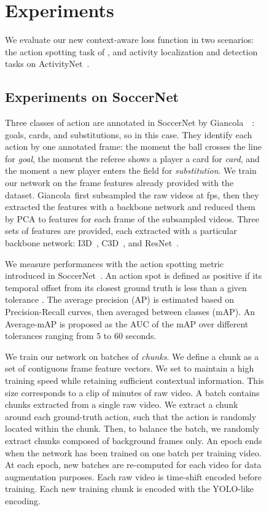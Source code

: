 \documentclass[10pt,twocolumn,letterpaper]{article}
\begin{document}
\begin{figure}[t]
{\begin{minipage}{\linewidth}
 \section{Experiments}
\label{sec:Exp}

We evaluate our new context-aware loss function in two scenarios: the action spotting task of \SoccerNet, and activity localization and detection tasks on ActivityNet~\cite{caba2015activitynet}.

\subsection{Experiments on SoccerNet}

 Three classes of action are annotated in SoccerNet by Giancola~\etal~\cite{Giancola_2018_CVPR_Workshops}: goals, cards, and substitutions, so  in this case. They identify each action by one annotated frame: the moment the ball crosses the line for \emph{goal}, the moment the referee shows a player a card for \emph{card}, and the moment a new player enters the field for \emph{substitution}. We train our network on the frame features already provided with the dataset. Giancola~\etal first subsampled the raw videos at  fps, then they extracted the features with a backbone network and reduced them by PCA to  features for each frame of the subsampled videos. Three sets of features are provided, each extracted with a particular backbone network: I3D~\cite{Carreira_2017_CVPR}, C3D~\cite{Tran2015ICCV}, and ResNet~\cite{He_2016_CVPR}.


We measure performances with the action spotting metric introduced in SoccerNet~\cite{Giancola_2018_CVPR_Workshops}. An action spot is defined as positive if its temporal offset from its closest ground truth is less than a given tolerance . The average precision (AP) is estimated based on Precision-Recall curves, then averaged between classes (mAP). An Average-mAP is proposed as the AUC of the mAP over different tolerances  ranging from 5 to 60 seconds.


 We train our network on batches of \emph{chunks}. We define a chunk as a set of  contiguous frame feature vectors. We set  to maintain a high training speed while retaining sufficient contextual information. This size corresponds to a clip of  minutes of raw video. A batch contains chunks extracted from a single raw video. We extract a chunk around each ground-truth action, such that the action is randomly located within the chunk. Then, to balance the batch, we randomly extract  chunks composed of background frames only. An epoch ends when the network has been trained on one batch per training video. At each epoch, new batches are re-computed for each video for data augmentation purposes. Each raw video is time-shift encoded before training. Each new training chunk is encoded with the YOLO-like encoding. 



\end{minipage}}
\end{figure}
\end{document}

